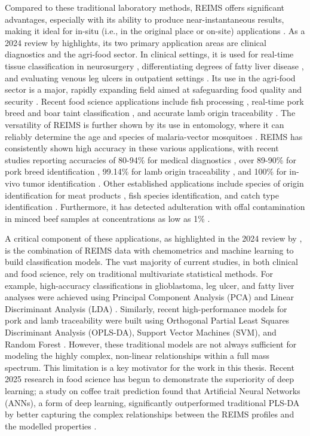 Compared to these traditional laboratory methods, REIMS offers significant advantages, especially with its ability to produce near-instantaneous results, making it ideal for in-situ (i.e., in the original place or on-site) applications \citep{Hendriks2025, Cai2025, Henderson2025}. As a 2024 review by \citet{Cafarella2024} highlights, its two primary application areas are clinical diagnostics and the agri-food sector. In clinical settings, it is used for real-time tissue classification in neurosurgery \citep{Hendriks2025}, differentiating degrees of fatty liver disease \citep{Eckel2025}, and evaluating venous leg ulcers in outpatient settings \citep{Pruekprasert2025}. Its use in the agri-food sector is a major, rapidly expanding field aimed at safeguarding food quality and security \citep{Cafarella2024, Henderson2025}. Recent food science applications include fish processing \citep{Black2017}, real-time pork breed and boar taint classification \citep{Gkarane2025, Verplanken2016}, and accurate lamb origin traceability \citep{Gao2025}. The versatility of REIMS is further shown by its use in entomology, where it can reliably determine the age and species of malaria-vector mosquitoes \citep{Wagner2025}. REIMS has consistently shown high accuracy in these various applications, with recent studies reporting accuracies of 80-94\% for medical diagnostics \citep{Pruekprasert2025, Wagner2025}, over 89-90\% for pork breed identification \citep{Gkarane2025}, 99.14\% for lamb origin traceability \citep{Gao2025}, and 100\% for in-vivo tumor identification \citep{Hendriks2025}. Other established applications include species of origin identification for meat products \citep{Balog2016}, fish species identification, and catch type identification \citep{Black2017}. Furthermore, it has detected adulteration with offal contamination in minced beef samples at concentrations as low as 1\% \citep{Black2019}.

A critical component of these applications, as highlighted in the 2024 review by \citet{Cafarella2024}, is the combination of REIMS data with chemometrics and machine learning to build classification models. The vast majority of current studies, in both clinical and food science, rely on traditional multivariate statistical methods. For example, high-accuracy classifications in glioblastoma, leg ulcer, and fatty liver analyses were achieved using Principal Component Analysis (PCA) and Linear Discriminant Analysis (LDA) \citep{Hendriks2025, Pruekprasert2025, Eckel2025}. Similarly, recent high-performance models for pork and lamb traceability were built using Orthogonal Partial Least Squares Discriminant Analysis (OPLS-DA), Support Vector Machines (SVM), and Random Forest \citep{Gkarane2025, Gao2025}. However, these traditional models are not always sufficient for modeling the highly complex, non-linear relationships within a full mass spectrum. This limitation is a key motivator for the work in this thesis. Recent 2025 research in food science has begun to demonstrate the superiority of deep learning; a study on coffee trait prediction found that Artificial Neural Networks (ANNs), a form of deep learning, significantly outperformed traditional PLS-DA by better capturing the complex relationships between the REIMS profiles and the modelled properties \citep{Cardoso2025}.

